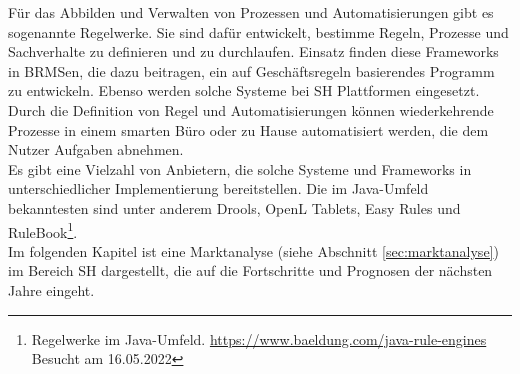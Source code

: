         \linebreak
        Für das Abbilden und Verwalten von Prozessen und Automatisierungen gibt es sogenannte Regelwerke. 
        Sie sind dafür entwickelt, bestimme Regeln, Prozesse und Sachverhalte zu definieren und zu durchlaufen. 
        Einsatz finden diese Frameworks in \ac{BRMS}en, die dazu beitragen, ein auf Geschäftsregeln basierendes Programm zu entwickeln. 
        Ebenso werden solche Systeme bei \acl{SH} Plattformen eingesetzt. Durch die Definition von Regel und Automatisierungen 
        können wiederkehrende Prozesse in einem smarten 
        Büro oder zu Hause automatisiert werden, die dem Nutzer Aufgaben abnehmen.
        \\
        Es gibt eine Vielzahl von Anbietern, die solche Systeme und Frameworks 
        in unterschiedlicher Implementierung bereitstellen. Die im Java-Umfeld bekanntesten sind unter anderem Drools, OpenL Tablets, 
        Easy Rules und RuleBook\footnote{Regelwerke im Java-Umfeld. \url{https://www.baeldung.com/java-rule-engines} Besucht am 16.05.2022}.
        \\
        Im folgenden Kapitel ist eine Marktanalyse (siehe Abschnitt \ref{sec:marktanalyse}) im Bereich \acl{SH} dargestellt, die auf die Fortschritte 
        und Prognosen der nächsten Jahre eingeht.
